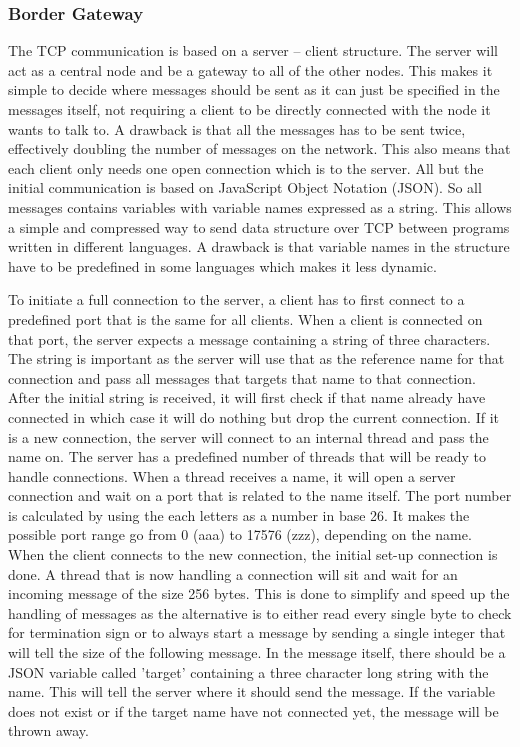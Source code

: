 \subsubsection{Border Gateway} %
\noindent The TCP communication is based on a server – client structure. The server will act as a central node and be a gateway to all of the other nodes. This makes it simple to decide where messages should be sent as it can just be specified in the messages itself, not requiring a client to be directly connected with the node it wants to talk to. A drawback is that all the messages has to be sent twice, effectively doubling the number of messages on the network. This also means that each client only needs one open connection which is to the server. All but the initial communication is based on JavaScript Object Notation (JSON). So all messages contains variables with variable names expressed as a string. This allows a simple and compressed way to send data structure over TCP between programs written in different languages. A drawback is that variable names in the structure have to be predefined in some languages which makes it less dynamic. 

To initiate a full connection to the server, a client has to first connect to a predefined port that is the same for all clients. When a client is connected on that port, the server expects a message containing a string of three characters. The string is important as the server will use that as the reference name for that connection and pass all messages that targets that name to that connection. After the initial string is received, it will first check if that name already have connected in which case it will do nothing but drop the current connection. If it is a new connection, the server will connect to an internal thread and pass the name on. The server has a predefined number of threads that will be ready to handle connections. When a thread receives a name, it will open a server connection and wait on a port that is related to the name itself. The port number is calculated by using the each letters as a number in base 26. It makes the possible port range go from 0 (aaa) to 17576 (zzz), depending on the name. When the client connects to the new connection, the initial set-up connection is done. A thread that is now handling a connection will sit and wait for an incoming message of the size 256 bytes. This is done to simplify and speed up the handling of messages as the alternative is to either read every single byte to check for termination sign or to always start a message by sending a single integer that will tell the size of the following message. In the message itself, there should be a JSON variable called 'target' containing a three character long string with the name. This will tell the server where it should send the message. If the variable does not exist or if the target name have not connected yet, the message will be thrown away. 

